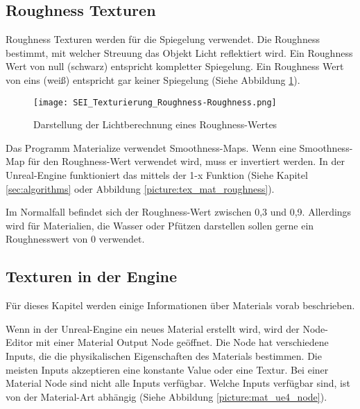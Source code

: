 \subsection{Roughness Texturen}
\label{sec:tex_roughness}

Roughness Texturen werden für die Spiegelung verwendet. Die Roughness bestimmt, mit welcher Streuung das Objekt Licht
reflektiert wird. Ein Roughness Wert von null (schwarz) entspricht kompletter Spiegelung. Ein Roughness Wert von eins
(weiß) entspricht gar keiner Spiegelung (Siehe Abbildung \ref{picture:roughness_illustration}).

\begin{figure}[h]
    \centering
    \texttt{[image: SEI\_Texturierung\_Roughness-Roughness.png]}
    \caption{Darstellung der Lichtberechnung eines Roughness-Wertes}
    \label{picture:roughness_illustration}
\end{figure}


Das Programm Materialize verwendet Smoothness-Maps. Wenn eine Smoothness-Map für den Roughness-Wert verwendet wird,
muss er invertiert werden. In der Unreal-Engine funktioniert das mittels der 1-x Funktion (Siehe
Kapitel \ref{sec:algorithms} oder Abbildung \ref{picture:tex_mat_roughness}).

Im Normalfall befindet sich der Roughness-Wert zwischen 0,3 und 0,9. Allerdings wird für Materialien, die Wasser oder
Pfützen darstellen sollen gerne ein Roughnesswert von 0 verwendet.

\subsection{Texturen in der Engine}
\label{sec:tex_inside_engine}

Für dieses Kapitel werden einige Informationen über Materials vorab beschrieben.


Wenn in der Unreal-Engine ein neues Material erstellt wird, wird der Node-Editor\citep{ue:node_introduction} mit einer
Material Output Node geöffnet. Die Node hat verschiedene Inputs, die die physikalischen Eigenschaften des Materials
bestimmen. Die meisten Inputs akzeptieren eine konstante Value oder eine Textur. Bei einer Material Node sind nicht
alle Inputs verfügbar. Welche Inputs verfügbar sind, ist von der Material-Art abhängig (Siehe
Abbildung \ref{picture:mat_ue4_node}).


